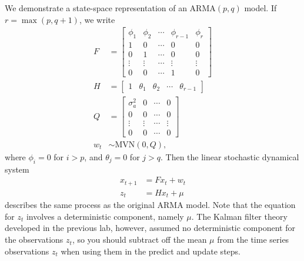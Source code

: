 We demonstrate a state-space representation of an $\text{ARMA}(p,q)$ model. If
$r = \max(p, q+1)$, we write
\begin{align}
    F &= \begin{bmatrix}
        \phi_1 & \phi_2 & \cdots & \phi_{r-1} & \phi_r\\
        1 & 0 & \cdots & 0 & 0\\
        0 & 1 & \cdots & 0 & 0\\
        \vdots & \vdots & \cdots & \vdots & \vdots\\
        0 & 0 & \cdots & 1 & 0
    \end{bmatrix}\\
    H &= \begin{bmatrix}
        1 & \theta_1 & \theta_2 & \cdots & \theta_{r-1}
    \end{bmatrix}\\
    Q &= \begin{bmatrix}
        \sigma_a^2 & 0 & \cdots & 0\\
        0 & 0 & \cdots & 0\\
        \vdots & \vdots & \cdots & \vdots\\
        0 & 0 & \cdots & 0
    \end{bmatrix}\\
    w_t &\sim \text{MVN}(0, Q),
\end{align}
where $\phi_i = 0$ for $i>p$, and $\theta_j = 0$ for $j > q$. Then the linear stochastic
dynamical system
\begin{align}
    x_{t+1} &= Fx_t + w_t\\
    z_t &= Hx_t + \mu
\end{align}
describes the same process as the original $\text{ARMA}$ model.
Note that the equation for $z_t$ involves a deterministic component, namely $\mu$.
The Kalman filter theory developed in the previous lab, however, assumed no
deterministic component for the observations $z_t$, so you should subtract off the mean
$\mu$ from the time series observations $z_t$ when using them in the predict and update
steps.

